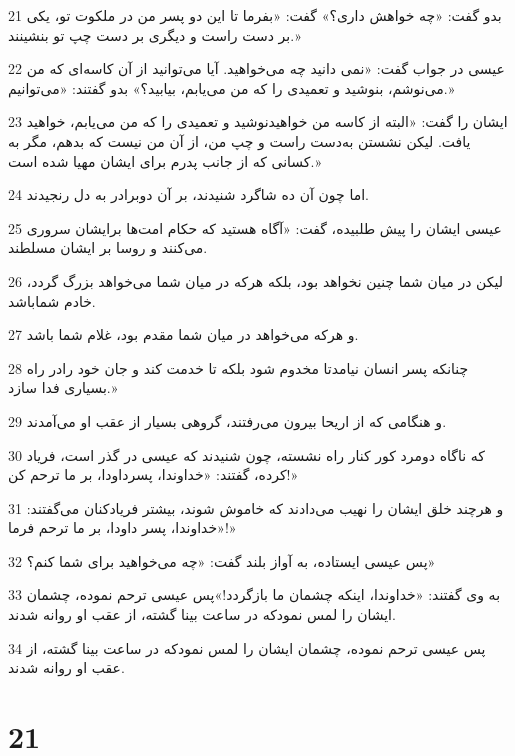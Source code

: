 \par 21 بدو گفت: «چه خواهش داری؟» گفت: «بفرما تا این دو پسر من در ملکوت تو، یکی بر دست راست و دیگری بر دست چپ تو بنشینند.»
\par 22 عیسی در جواب گفت: «نمی دانید چه می‌خواهید. آیا می‌توانید از آن کاسه‌ای که من می‌نوشم، بنوشید و تعمیدی را که من می‌یابم، بیابید؟» بدو گفتند: «می‌توانیم.»
\par 23 ایشان را گفت: «البته از کاسه من خواهیدنوشید و تعمیدی را که من می‌یابم، خواهید یافت. لیکن نشستن به‌دست راست و چپ من، از آن من نیست که بدهم، مگر به کسانی که از جانب پدرم برای ایشان مهیا شده است.»
\par 24 اما چون آن ده شاگرد شنیدند، بر آن دوبرادر به دل رنجیدند.
\par 25 عیسی ایشان را پیش طلبیده، گفت: «آگاه هستید که حکام امت‌ها برایشان سروری می‌کنند و روسا بر ایشان مسلطند.
\par 26 لیکن در میان شما چنین نخواهد بود، بلکه هرکه در میان شما می‌خواهد بزرگ گردد، خادم شماباشد.
\par 27 و هر‌که می‌خواهد در میان شما مقدم بود، غلام شما باشد.
\par 28 چنانکه پسر انسان نیامدتا مخدوم شود بلکه تا خدمت کند و جان خود رادر راه بسیاری فدا سازد.»
\par 29 و هنگامی که از اریحا بیرون می‌رفتند، گروهی بسیار از عقب او می‌آمدند.
\par 30 که ناگاه دومرد کور کنار راه نشسته، چون شنیدند که عیسی در گذر است، فریاد کرده، گفتند: «خداوندا، پسرداودا، بر ما ترحم کن!»
\par 31 و هر‌چند خلق ایشان را نهیب می‌دادند که خاموش شوند، بیشتر فریادکنان می‌گفتند: «خداوندا، پسر داودا، بر ما ترحم فرما!»
\par 32 پس عیسی ایستاده، به آواز بلند گفت: «چه می‌خواهید برای شما کنم؟»
\par 33 به وی گفتند: «خداوندا، اینکه چشمان ما باز‌گردد!»پس عیسی ترحم نموده، چشمان ایشان را لمس نمودکه در ساعت بینا گشته، از عقب او روانه شدند.
\par 34 پس عیسی ترحم نموده، چشمان ایشان را لمس نمودکه در ساعت بینا گشته، از عقب او روانه شدند.

\chapter{21}


